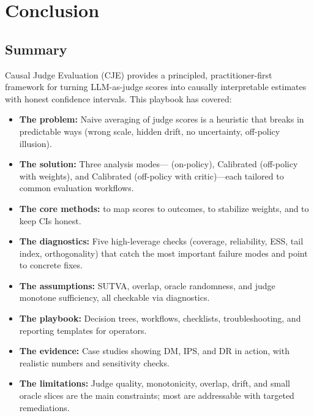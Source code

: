 \section{Conclusion}

\subsection{Summary}

Causal Judge Evaluation (CJE) provides a principled, practitioner-first framework for turning LLM-as-judge scores into causally interpretable estimates with honest confidence intervals. This playbook has covered:

\begin{itemize}
\item \textbf{The problem:} Naive averaging of judge scores is a heuristic that breaks in predictable ways (wrong scale, hidden drift, no uncertainty, off-policy illusion).

\item \textbf{The solution:} Three analysis modes---\dm{} (on-policy), Calibrated \ips{} (off-policy with weights), and Calibrated \dr{} (off-policy with critic)---each tailored to common evaluation workflows.

\item \textbf{The core methods:} \autocal{} to map scores to outcomes, \simcal{} to stabilize weights, and \oua{} to keep CIs honest.

\item \textbf{The diagnostics:} Five high-leverage checks (coverage, reliability, ESS, tail index, orthogonality) that catch the most important failure modes and point to concrete fixes.

\item \textbf{The assumptions:} SUTVA, overlap, oracle randomness, and judge monotone sufficiency, all checkable via diagnostics.

\item \textbf{The playbook:} Decision trees, workflows, checklists, troubleshooting, and reporting templates for operators.

\item \textbf{The evidence:} Case studies showing DM, IPS, and DR in action, with realistic numbers and sensitivity checks.

\item \textbf{The limitations:} Judge quality, monotonicity, overlap, drift, and small oracle slices are the main constraints; most are addressable with targeted remediations.
\end{itemize}

